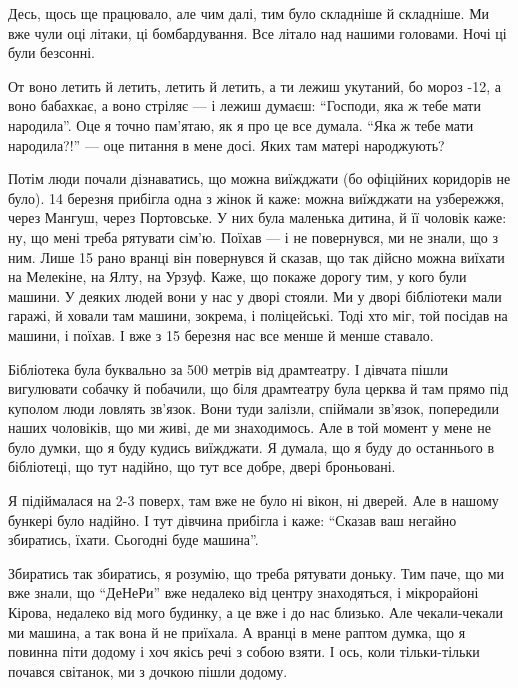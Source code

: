 
Десь, щось ще працювало, але чим далі, тим було складніше й складніше. Ми вже
чули оці літаки, ці бомбардування. Все літало над нашими головами. Ночі ці були
безсонні.

\begin{qqquote}
От воно летить й летить, летить й летить, а ти лежиш укутаний, бо мороз -12, а
воно бабахкає, а воно стріляє — і лежиш думаєш: \enquote{Господи, яка ж тебе мати
народила}. Оце я точно пам'ятаю, як я про це все думала. \enquote{Яка ж тебе мати
народила?!} — оце питання в мене досі. Яких там матері народжують?	
\end{qqquote}

Потім люди почали дізнаватись, що можна виїжджати (бо офіційних коридорів не
було). 14 березня прибігла одна з жінок й каже: можна виїжджати на узбережжя,
через Мангуш, через Портовське. У них була маленька дитина, й її чоловік каже:
ну, що мені треба рятувати сім'ю. Поїхав — і не повернувся, ми не знали, що з
ним. Лише 15 рано вранці він повернувся й сказав, що так дійсно можна виїхати
на Мелекіне, на Ялту, на Урзуф. Каже, що покаже дорогу тим, у кого були машини.
У деяких людей вони у нас у дворі стояли. Ми у дворі бібліотеки мали гаражі, й
ховали там машини, зокрема, і поліцейські. Тоді хто міг, той посідав на машини,
і поїхав. І вже з 15 березня нас все менше й менше ставало.

Бібліотека була буквально за 500 метрів від драмтеатру. І дівчата пішли
вигулювати собачку й побачили, що біля драмтеатру була церква й там прямо під
куполом люди ловлять зв'язок. Вони туди залізли, спіймали зв'язок, попередили
наших чоловіків, що ми живі, де ми знаходимось. Але в той момент у мене не було
думки, що я буду кудись виїжджати. Я думала, що я буду до останнього в
бібліотеці, що тут надійно, що тут все добре, двері броньовані.

Я підіймалася на 2-3 поверх, там вже не було ні вікон, ні дверей. Але в нашому
бункері було надійно. І тут дівчина прибігла і каже: \enquote{Сказав ваш негайно
збиратись, їхати. Сьогодні буде машина}.

Збиратись так збиратись, я розумію, що треба рятувати доньку. Тим паче, що ми
вже знали, що \enquote{ДеНеРи} вже недалеко від центру знаходяться, і мікрорайоні
Кірова, недалеко від мого будинку, а це вже і до нас близько. Але чекали-чекали
ми машина, а так вона й не приїхала. А вранці в мене раптом думка, що я повинна
піти додому і хоч якісь речі з собою взяти. І ось, коли тільки-тільки почався
світанок, ми з дочкою пішли додому.

